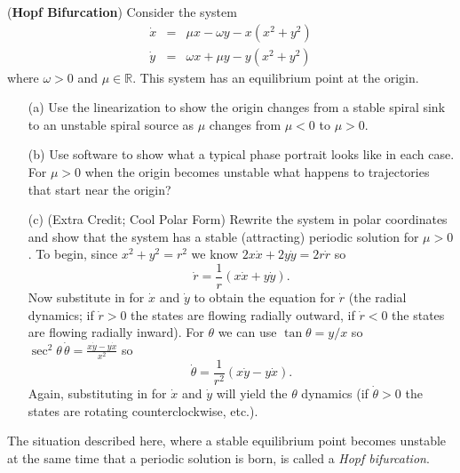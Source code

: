\documentclass[11pt,letterpaper,boxed]{hmcpset}
\begin{document}
\begin{problem}[5.] (\textbf{Hopf Bifurcation})  Consider the system
 \begin{eqnarray*}
\dot{x} & = &\mu x - \omega y - x(x^2 + y^2)\\
\dot{y} & = & \omega x + \mu y - y(x^2 + y^2)
\end{eqnarray*}
where $\omega >0$ and $\mu \in \mathbb{R}$.  This system has an equilibrium point at the origin. 
\begin{enumerate}
\item[(a)]  Use the linearization to show the origin changes from a stable spiral sink to an unstable spiral source as $\mu$ changes from $\mu < 0$ to $\mu > 0$. 
\item[(b)] Use software to show what a typical phase portrait looks like in each case. For $\mu > 0$ when the origin becomes unstable what happens to trajectories that start near the origin? 
\item[(c)] (Extra Credit; Cool Polar Form)
Rewrite the system in polar coordinates and show that the system has a stable (attracting) periodic solution for  $\mu > 0$.  To begin, since $x^2 + y^2 = r^2$ we know $2 x \dot{x} + 2 y \dot{y} = 2 r \dot{r}$ so 
\[ \dot{r} = \frac{1}{r} (x \dot{x} + y \dot{y}).  \]
Now substitute in for $\dot{x}$ and $\dot{y}$ to obtain the equation for $\dot{r}$ (the radial dynamics; if $\dot{r} > 0$ the states are flowing radially outward, if $\dot{r} < 0$ the states are flowing radially inward). For $\theta$ we can use $\tan \theta = y/x$ so $\sec^2 \theta \, \dot{\theta} = \frac{x\dot{y} - y \dot{x}}{x^2}$ so
\[ \dot{\theta} = \frac{1}{r^2} (x \dot{y} - y \dot{x}).  \]
Again, substituting in for $\dot{x}$ and $\dot{y}$ will yield the $\theta$ dynamics (if $\dot{\theta} > 0$ the states are rotating counterclockwise, etc.). 
\end{enumerate}
The situation described here, where a stable equilibrium point becomes unstable at the same time that a periodic  solution is born, is called a \textit{Hopf bifurcation}. 
\end{problem}

\begin{solution}
\vfill
\end{solution}
\newpage
\end{document}

